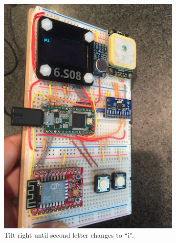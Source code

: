 \documentclass[12pt]{article}
\begin{document}
\begin{figure}
\begin{subfigure}[b]{.3\linewidth}
\includegraphics[width=\linewidth]{text-pi}
\caption{Tilt right until second letter changes to ``i".}
\label{fig:text-pi}
\end{subfigure}
\begin{subfigure}[b]{.3\linewidth}

\end{subfigure}
\end{figure}
\end{document}
